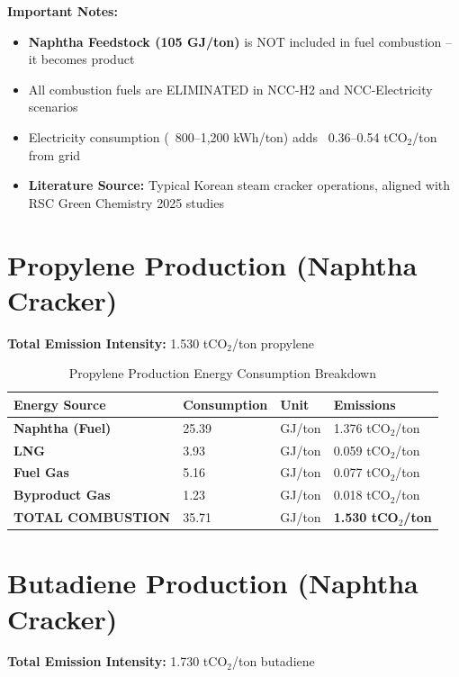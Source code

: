 \documentclass[11pt,a4paper]{report}
\newcommand{\tco}{tCO$_2$}
\begin{document}
\textbf{Important Notes:}
\begin{itemize}[leftmargin=*]
    \item \textbf{Naphtha Feedstock (105 GJ/ton)} is NOT included in fuel combustion -- it becomes product
    \item All combustion fuels are ELIMINATED in NCC-H2 and NCC-Electricity scenarios
    \item Electricity consumption (~800--1,200 kWh/ton) adds ~0.36--0.54 \tco/ton from grid
    \item \textbf{Literature Source:} Typical Korean steam cracker operations, aligned with RSC Green Chemistry 2025 studies
\end{itemize}

\section{Propylene Production (Naphtha Cracker)}

\textbf{Total Emission Intensity:} 1.530 \tco/ton propylene

\begin{table}[H]
\centering
\caption{Propylene Production Energy Consumption Breakdown}
\begin{tabular}{p{5cm}p{3cm}p{2cm}p{3cm}}
\toprule
\textbf{Energy Source} & \textbf{Consumption} & \textbf{Unit} & \textbf{Emissions} \\
\midrule
\textbf{Naphtha (Fuel)} & 25.39 & GJ/ton & 1.376 \tco/ton \\
\textbf{LNG} & 3.93 & GJ/ton & 0.059 \tco/ton \\
\textbf{Fuel Gas} & 5.16 & GJ/ton & 0.077 \tco/ton \\
\textbf{Byproduct Gas} & 1.23 & GJ/ton & 0.018 \tco/ton \\
\midrule
\textbf{TOTAL COMBUSTION} & 35.71 & GJ/ton & \textbf{1.530 \tco/ton} \\
\bottomrule
\end{tabular}
\label{tab:propylene-baseline}
\end{table}

\section{Butadiene Production (Naphtha Cracker)}

\textbf{Total Emission Intensity:} 1.730 \tco/ton butadiene
\end{document}

